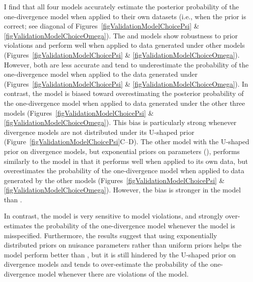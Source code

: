 I find that all four models accurately estimate the posterior probability of
the one-divergence model when applied to their own datasets (i.e., when the
prior is correct; see diagonal of Figures~\ref{figValidationModelChoicePsi} \&
\ref{figValidationModelChoiceOmega}).
The \modelUniform and \modelDPP models show robustness to prior violations and
perform well when applied to data generated under other models
(Figures~\ref{figValidationModelChoicePsi} \&
\ref{figValidationModelChoiceOmega}).
However, both are less accurate and tend to underestimate the probability of the
one-divergence model when applied to the data generated under \modelUshaped
(Figures~\ref{figValidationModelChoicePsi} \&
\ref{figValidationModelChoiceOmega}).
In contrast, the \modelOld model is biased toward overestimating the posterior
probability of the one-divergence model when applied to data generated under
the other three models
(Figures~\ref{figValidationModelChoicePsi} \&
\ref{figValidationModelChoiceOmega}).
This bias is particularly strong whenever divergence models are not
distributed under its U-shaped prior
(Figure~\ref{figValidationModelChoicePsi}C--D).
The other model with the U-shaped prior on divergence models, but exponential
priors on parameters (\modelUshaped), performs similarly to the \modelOld model
in that it performs well when applied to its own data, but overestimates the
probability of the one-divergence model when applied to data generated by the
other models
(Figures~\ref{figValidationModelChoicePsi} \&
\ref{figValidationModelChoiceOmega}).
However, the bias is stronger in the \modelOld model than \modelUshaped.

In contrast, the \modelOld model is very sensitive to model violations, and
strongly over-estimates the probability of the one-divergence model whenever
the model is misspecified.
Furthermore, the results suggest that using exponentially distributed priors on
nuisance parameters rather than uniform priors helps the \modelUshaped model
perform better than \modelOld, but it is still hindered by the U-shaped prior
on divergence models and tends to over-estimate the probability of the
one-divergence model whenever there are violations of the model.


